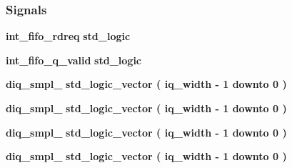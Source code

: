 \subsubsection*{Signals}
 \begin{DoxyCompactItemize}
\item 
{\bf int\+\_\+fifo\+\_\+rdreq} {\bfseries \textcolor{comment}{std\+\_\+logic}\textcolor{vhdlchar}{ }} 
\item 
{\bf int\+\_\+fifo\+\_\+q\+\_\+valid} {\bfseries \textcolor{comment}{std\+\_\+logic}\textcolor{vhdlchar}{ }} 
\item 
{\bf diq\+\_\+smpl\+\_} {\bfseries \textcolor{comment}{std\+\_\+logic\+\_\+vector}\textcolor{vhdlchar}{ }\textcolor{vhdlchar}{(}\textcolor{vhdlchar}{ }\textcolor{vhdlchar}{ }\textcolor{vhdlchar}{ }\textcolor{vhdlchar}{ }{\bfseries {\bf iq\+\_\+width}} \textcolor{vhdlchar}{-\/}\textcolor{vhdlchar}{ } \textcolor{vhdldigit}{1} \textcolor{vhdlchar}{ }\textcolor{keywordflow}{downto}\textcolor{vhdlchar}{ }\textcolor{vhdlchar}{ } \textcolor{vhdldigit}{0} \textcolor{vhdlchar}{ }\textcolor{vhdlchar}{)}\textcolor{vhdlchar}{ }} 
\item 
{\bf diq\+\_\+smpl\+\_} {\bfseries \textcolor{comment}{std\+\_\+logic\+\_\+vector}\textcolor{vhdlchar}{ }\textcolor{vhdlchar}{(}\textcolor{vhdlchar}{ }\textcolor{vhdlchar}{ }\textcolor{vhdlchar}{ }\textcolor{vhdlchar}{ }{\bfseries {\bf iq\+\_\+width}} \textcolor{vhdlchar}{-\/}\textcolor{vhdlchar}{ } \textcolor{vhdldigit}{1} \textcolor{vhdlchar}{ }\textcolor{keywordflow}{downto}\textcolor{vhdlchar}{ }\textcolor{vhdlchar}{ } \textcolor{vhdldigit}{0} \textcolor{vhdlchar}{ }\textcolor{vhdlchar}{)}\textcolor{vhdlchar}{ }} 
\item 
{\bf diq\+\_\+smpl\+\_} {\bfseries \textcolor{comment}{std\+\_\+logic\+\_\+vector}\textcolor{vhdlchar}{ }\textcolor{vhdlchar}{(}\textcolor{vhdlchar}{ }\textcolor{vhdlchar}{ }\textcolor{vhdlchar}{ }\textcolor{vhdlchar}{ }{\bfseries {\bf iq\+\_\+width}} \textcolor{vhdlchar}{-\/}\textcolor{vhdlchar}{ } \textcolor{vhdldigit}{1} \textcolor{vhdlchar}{ }\textcolor{keywordflow}{downto}\textcolor{vhdlchar}{ }\textcolor{vhdlchar}{ } \textcolor{vhdldigit}{0} \textcolor{vhdlchar}{ }\textcolor{vhdlchar}{)}\textcolor{vhdlchar}{ }} 
\item 
{\bf diq\+\_\+smpl\+\_} {\bfseries \textcolor{comment}{std\+\_\+logic\+\_\+vector}\textcolor{vhdlchar}{ }\textcolor{vhdlchar}{(}\textcolor{vhdlchar}{ }\textcolor{vhdlchar}{ }\textcolor{vhdlchar}{ }\textcolor{vhdlchar}{ }{\bfseries {\bf iq\+\_\+width}} \textcolor{vhdlchar}{-\/}\textcolor{vhdlchar}{ } \textcolor{vhdldigit}{1} \textcolor{vhdlchar}{ }\textcolor{keywordflow}{downto}\textcolor{vhdlchar}{ }\textcolor{vhdlchar}{ } \textcolor{vhdldigit}{0} \textcolor{vhdlchar}{ }\textcolor{vhdlchar}{)}\textcolor{vhdlchar}{ }} 

\end{DoxyCompactItemize}
